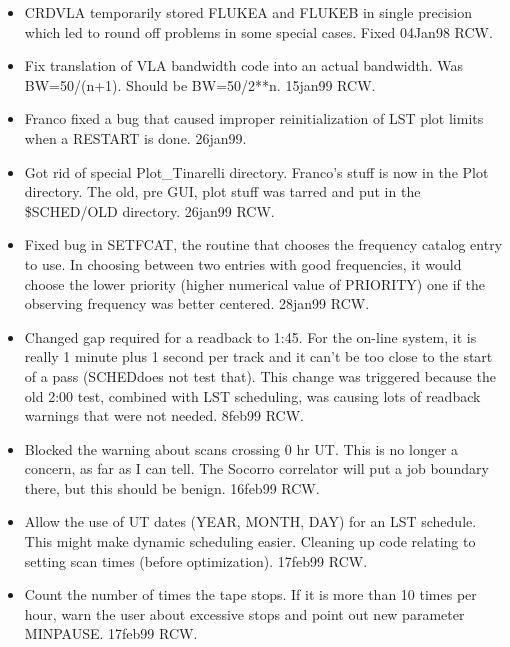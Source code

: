 \documentclass{report}
\newcommand{\sched}{{\sc SCHED}}
\begin{document}
\begin{itemize}

\item  CRDVLA temporarily stored FLUKEA and FLUKEB in single precision
       which led to round off problems in some special cases.  Fixed
       04Jan98  RCW.

\item  Fix translation of VLA bandwidth code into an actual bandwidth.
       Was BW=50/(n+1).  Should be BW=50/2**n.  15jan99 RCW.

\item  Franco fixed a bug that caused improper reinitialization of
       LST plot limits when a RESTART is done.  26jan99.

\item  Got rid of special Plot\_Tinarelli directory.  Franco's stuff
       is now in the Plot directory.  The old, pre GUI, plot stuff
       was tarred and put in the \$SCHED/OLD directory.  26jan99 RCW.

\item  Fixed bug in SETFCAT, the routine that chooses the frequency
       catalog entry to use.  In choosing between two entries with
       good frequencies, it would choose the lower priority (higher
       numerical value of PRIORITY) one if the observing frequency
       was better centered.  28jan99 RCW.

\item  Changed gap required for a readback to 1:45.  For the on-line
       system, it is really 1 minute plus 1 second per track and
       it can't be too close to the start of a pass (\sched does not
       test that).  This change was triggered because the old 2:00
       test, combined with LST scheduling, was causing lots of
       readback warnings that were not needed.  8feb99 RCW.

\item  Blocked the warning about scans crossing 0 hr UT.  This is
       no longer a concern, as far as I can tell.  The Socorro
       correlator will put a job boundary there, but this should be
       benign.  16feb99 RCW.

\item  Allow the use of UT dates (YEAR, MONTH, DAY) for an LST
       schedule.  This might make dynamic scheduling easier.
       Cleaning up code relating to setting scan times (before
       optimization).  17feb99 RCW.

\item  Count the number of times the tape stops.  If it is more
       than 10 times per hour, warn the user about excessive stops
       and point out new parameter MINPAUSE.  17feb99 RCW.


\end{itemize}
\end{document}
